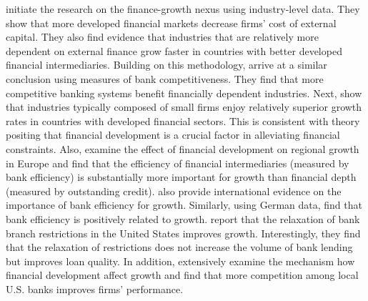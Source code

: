 \citet{RajanZingales1998} initiate the research on the finance-growth nexus using industry-level data. They show that more developed financial markets decrease firms' cost of external capital. They also find evidence that industries that are relatively more dependent on external finance grow faster in countries with better developed financial intermediaries. Building on this methodology, \citet{ClaessensLaeven2005} arrive at a similar conclusion using measures of bank competitiveness. They find that more competitive banking systems benefit financially dependent industries. Next, \citet{Becketal2005} show that industries typically composed of small firms enjoy relatively superior growth rates in countries with developed financial sectors. This is consistent with theory positing that financial development is a crucial factor in alleviating financial constraints. Also, \citet{Hasanetal2009} examine the effect of financial development on regional growth in Europe and find that the efficiency of financial intermediaries (measured by bank efficiency) is substantially more important for growth than financial depth (measured by outstanding credit). \citet{Bergeretal2004} also provide international evidence on the importance of bank efficiency for growth. Similarly, using German data, \citet{KoetterWedow2010} find that bank efficiency is positively related to growth. \citet{JayaratneStrahan1996} report that the relaxation of bank branch restrictions in the United States improves growth. Interestingly, they find that the relaxation of restrictions does not increase the volume of bank lending but improves loan quality. In addition, \citet{CetorelliStraha2006} extensively examine the mechanism how financial development affect growth and find that more competition among local U.S. banks improves firms' performance. 

